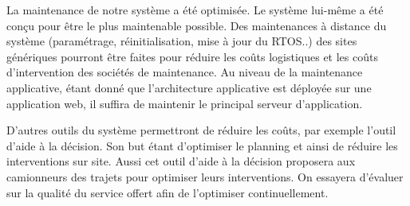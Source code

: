 La maintenance de notre système a été optimisée. Le système lui-même a été conçu pour être le plus maintenable possible. Des maintenances à distance du système (paramétrage, réinitialisation, mise à jour du RTOS..) des sites génériques pourront être faites pour réduire les coûts logistiques et les coûts d’intervention des sociétés de maintenance. Au niveau de la maintenance applicative, étant donné que l’architecture applicative est déployée sur une application web, il suffira de maintenir le principal serveur d’application.

	D’autres outils du système permettront de réduire les coûts, par exemple l’outil d’aide à la décision. Son but étant d’optimiser le planning et ainsi de réduire les interventions sur site. Aussi cet outil d’aide à la décision proposera aux camionneurs des trajets pour optimiser leurs interventions. On essayera d’évaluer sur la qualité du service offert afin de l’optimiser continuellement.



